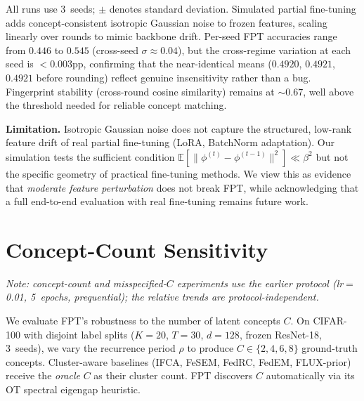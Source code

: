 \documentclass[11pt]{article}
\newcommand{\E}{\mathbb{E}}
\begin{document}
\noindent All runs use 3~seeds; $\pm$ denotes standard deviation.
Simulated partial fine-tuning adds concept-consistent isotropic Gaussian noise to frozen features, scaling linearly over rounds to mimic backbone drift.
Per-seed FPT accuracies range from $0.446$ to $0.545$ (cross-seed $\sigma \approx 0.04$), but the cross-regime variation at each seed is $< 0.003$pp, confirming that the near-identical means ($0.4920$, $0.4921$, $0.4921$ before rounding) reflect genuine insensitivity rather than a bug.
Fingerprint stability (cross-round cosine similarity) remains at ${\sim}0.67$, well above the threshold needed for reliable concept matching.

\textbf{Limitation.} Isotropic Gaussian noise does not capture the structured, low-rank feature drift of real partial fine-tuning (LoRA, BatchNorm adaptation).
Our simulation tests the sufficient condition $\E[\|\phi^{(t)} - \phi^{(t-1)}\|^2] \ll \beta^2$ but not the specific geometry of practical fine-tuning methods.
We view this as evidence that \emph{moderate feature perturbation} does not break FPT, while acknowledging that a full end-to-end evaluation with real fine-tuning remains future work.


\section{Concept-Count Sensitivity}
\label{app:concept_count}

\emph{Note: concept-count and misspecified-$C$ experiments use the earlier protocol (lr$=$0.01, 5~epochs, prequential); the relative trends are protocol-independent.}

We evaluate FPT's robustness to the number of latent concepts $C$.
On CIFAR-100 with disjoint label splits ($K{=}20$, $T{=}30$, $d{=}128$, frozen ResNet-18, 3~seeds), we vary the recurrence period $\rho$ to produce $C \in \{2,4,6,8\}$ ground-truth concepts.
Cluster-aware baselines (IFCA, FeSEM, FedRC, FedEM, FLUX-prior) receive the \emph{oracle} $C$ as their cluster count.
FPT discovers $C$ automatically via its OT spectral eigengap heuristic.
\end{document}
